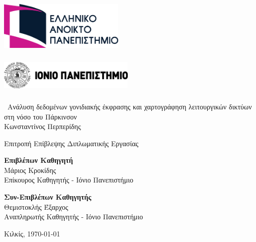 \documentclass[12pt]{report}
\begin{document}
\clearpage
\thispagestyle{empty} %
\begin{center}
    
    \begin{minipage}[t]{0.45\textwidth}
        \centering
        \includegraphics[height=2.4cm,width=6cm]{university1-logo.png}\\
    \end{minipage}
    \hfill
    \begin{minipage}[t]{0.45\textwidth}
        \centering
        \includegraphics[height=1.8cm,width=6.5cm]{university2-logo.png}\\
    \end{minipage}
    \vspace*{2cm}
    
    \fontsize{18pt}{22pt}\selectfont\
        Ανάλυση δεδομένων γονιδιακής έκφρασης και χαρτογράφηση λειτουργικών δικτύων στη νόσο του Πάρκινσον\\
    \vspace*{2.5cm}
    \large Κωνσταντίνος Περπερίδης\\
    \vspace*{2.5cm}
    \begin{center}
    \fontsize{12pt}{14pt}\selectfont
    Επιτροπή Επίβλεψης Διπλωματικής Εργασίας\\[16pt]
    \begin{minipage}[t]{0.45\textwidth}
        \centering
        \fontsize{12pt}{14pt}\selectfont
        \textbf{Επιβλέπων Καθηγητή}\\
        Μάριος Κροκίδης\\
        Επίκουρος Καθηγητής - Ιόνιο Πανεπιστήμιο
    \end{minipage}
    \hfill %
    \begin{minipage}[t]{0.45\textwidth}
        \centering
        \fontsize{12pt}{14pt}\selectfont
        \textbf{Συν-Επιβλέπων Καθηγητής}\\
        Θεμιστοκλής Έξαρχος\\
        Αναπληρωτής Καθηγητής - Ιόνιο Πανεπιστήμιο
    \end{minipage}
    \end{center}
    \vspace*{2.5cm}
    \fontsize{14pt}{16pt}\selectfont
    Κιλκίς, {\large \today}
    
    \vfill
\end{center}
\clearpage
\end{document}
